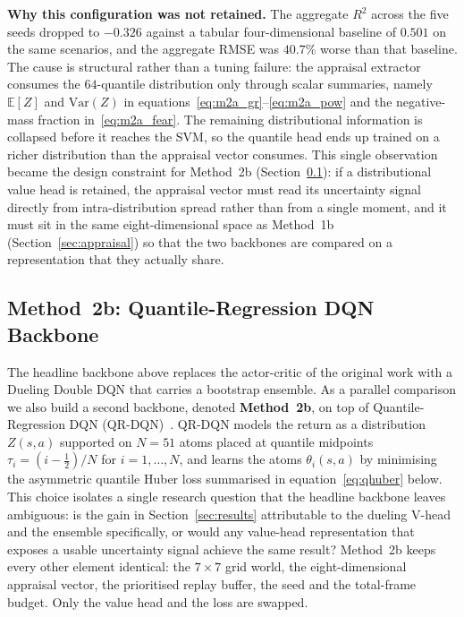 \documentclass[conference]{IEEEtran}
\begin{document}
\textbf{Why this configuration was not retained.} The aggregate
$R^{2}$ across the five seeds dropped to $-0.326$ against a tabular
four-dimensional baseline of $0.501$ on the same scenarios, and the
aggregate RMSE was $40.7\%$ worse than that baseline. The cause is
structural rather than a tuning failure: the appraisal extractor
consumes the $64$-quantile distribution only through scalar summaries,
namely $\mathbb{E}[Z]$ and $\mathrm{Var}(Z)$ in
equations~\eqref{eq:m2a_gr}--\eqref{eq:m2a_pow} and the
negative-mass fraction in~\eqref{eq:m2a_fear}. The remaining
distributional information is collapsed before it reaches the SVM, so
the quantile head ends up trained on a richer distribution than the
appraisal vector consumes. This single observation became the design
constraint for Method~2b (Section~\ref{sec:method2b}): if a
distributional value head is retained, the appraisal vector must read
its uncertainty signal directly from intra-distribution spread rather
than from a single moment, and it must sit in the same
eight-dimensional space as Method~1b
(Section~\ref{sec:appraisal}) so that the two backbones are compared
on a representation that they actually share.

\subsection{Method~2b: Quantile-Regression DQN Backbone}
\label{sec:method2b}
The headline backbone above replaces the actor-critic of the original
work with a Dueling Double DQN that carries a bootstrap ensemble. As a
parallel comparison we also build a second backbone, denoted
\textbf{Method~2b}, on top of Quantile-Regression DQN
(QR-DQN)~\cite{dabney2018qrdqn}. QR-DQN models the return as a
distribution $Z(s, a)$ supported on $N{=}51$ atoms placed at quantile
midpoints $\tau_{i} = (i - \tfrac{1}{2})/N$ for $i = 1, \dots, N$, and
learns the atoms $\theta_{i}(s, a)$ by minimising the asymmetric quantile
Huber loss summarised in equation~\eqref{eq:qhuber} below. This choice
isolates a single research question that the headline backbone leaves
ambiguous: is the gain in Section~\ref{sec:results} attributable to the
dueling V-head and the ensemble specifically, or would any value-head
representation that exposes a usable uncertainty signal achieve the same
result? Method~2b keeps every other element identical: the $7\times 7$
grid world, the eight-dimensional appraisal vector, the prioritised
replay buffer, the seed and the total-frame budget. Only the value head
and the loss are swapped.
\end{document}
